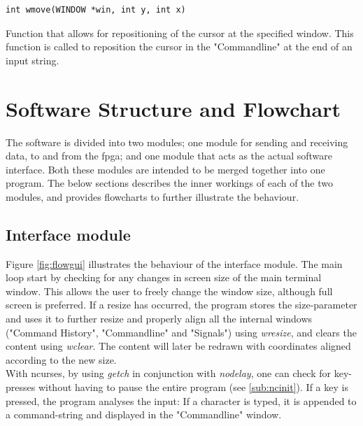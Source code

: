 \documentclass[main.tex]{subfiles}
\begin{document}
\begin{lstlisting}[frame=single] 
int wmove(WINDOW *win, int y, int x)
\end{lstlisting}
Function that allows for repositioning of the cursor at the specified window. This function is called to reposition the cursor in the "Commandline" at the end of an input string.

\section{Software Structure and Flowchart}

The software is divided into two modules; one module for sending and receiving data, to and from the \gls{fpga}; and one module that acts as the actual software interface. Both these modules are intended to be merged together into one program. The below sections describes the inner workings of each of the two modules, and provides flowcharts to further illustrate the behaviour.

\subsection{Interface module}
Figure \ref{fig:flowgui} illustrates the behaviour of the interface module. The main loop start by checking for any changes in screen size of the main terminal window. This allows the user to freely change the window size, although full screen is preferred. If a resize has occurred, the program stores the size-parameter and uses it to further resize and properly align all the internal windows ("Command History", "Commandline" and "Signals") using \textit{wresize}, and clears the content using \textit{wclear}. The content will later be redrawn with coordinates aligned according to the new size.\\

With ncurses, by using \textit{getch} in conjunction with \textit{nodelay}, one can check for key-presses without having to pause the entire program (see \ref{sub:ncinit}). If a key is pressed, the program analyses the input: If a character is typed, it is appended to a command-string and displayed in the "Commandline" window. 
\end{document}
